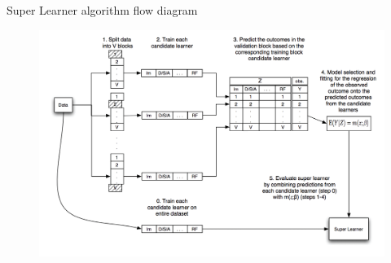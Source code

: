 
%
%


\begin{frame}{Super Learner algorithm flow diagram}

\begin{figure}
	\includegraphics[width=\textwidth]{./Figures/sup-learn.jpg}
\end{figure}

\end{frame}

